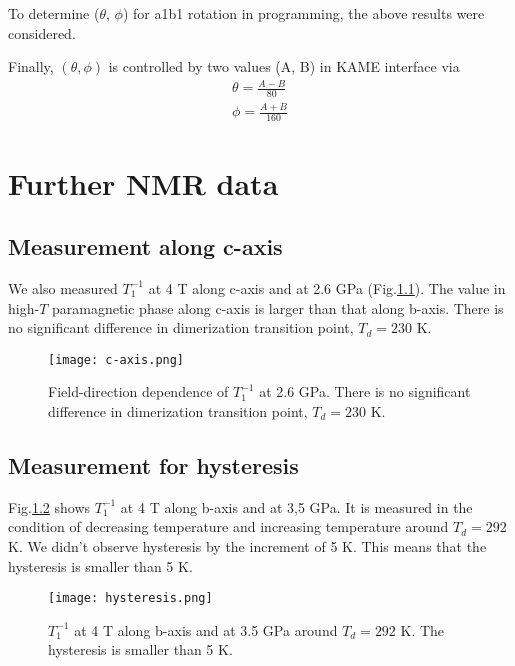 To determine ($\theta$, $\phi$) for a1b1 rotation in programming, the above results were considered.

Finally, $(\theta,\phi)$ is controlled by two values (A, B) in KAME interface via
\begin{align}
\theta = \frac{A-B}{80} \\
\phi = \frac{A+B}{160}
\end{align}

\chapter{Further NMR data}
\section{Measurement along c-axis}
We also measured $T^{-1}_1$ at 4 T along c-axis and at 2.6 GPa (Fig.\ref{c-axis}).
The value in high-$T$ paramagnetic phase along c-axis is larger than that along b-axis.
There is no significant difference in dimerization transition point, $T_d = 230$ K.

\begin{figure}
  \centering
  \texttt{[image: c-axis.png]}
  \caption{Field-direction dependence of $T^{-1}_1$ at 2.6 GPa.
  There is no significant difference in dimerization transition point, $T_d = 230$ K.}
  \label{c-axis}
\end{figure}

\section{Measurement for hysteresis}
Fig.\ref{hysteresis} shows $T^{-1}_1$ at 4 T along b-axis and at 3,5 GPa.
It is measured in the condition of decreasing temperature and increasing temperature around $T_d = 292$ K.
We didn't observe hysteresis by the increment of 5 K.
This means that the hysteresis is smaller than 5 K.

\begin{figure}
  \centering
  \texttt{[image: hysteresis.png]}
  \caption{$T^{-1}_1$ at 4 T along b-axis and at 3.5 GPa around $T_d = 292$ K.
  The hysteresis is smaller than 5 K.}
  \label{hysteresis}
\end{figure}


